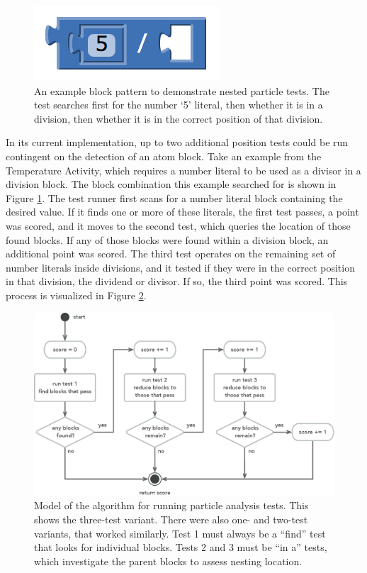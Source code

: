 \begin{figure}
  \centering
      \includegraphics{images/ch4-particle-example-5div}
  \caption[Example blocks to demonstrate nested particle tests]{An example block pattern to demonstrate nested particle tests. The test searches first for the number `5' literal, then whether it is in a division, then whether it is in the correct position of that division.}
  \label{fig:particle-example-5div}
\end{figure}
In its current implementation, up to two additional position tests could be run contingent on the detection of an atom block. Take an example from the Temperature Activity, which requires a number literal to be used as a divisor in a division block. The block combination this example searched for is shown in Figure \ref{fig:particle-example-5div}. The test runner first scans for a number literal block containing the desired value. If it finds one or more of these literals, the first test passes, a point was scored, and it moves to the second test, which queries the location of those found blocks. If any of those blocks were found within a division block, an additional point was scored. The third test operates on the remaining set of number literals inside divisions, and it tested if they were in the correct position in that division, the dividend or divisor. If so, the third point was scored. This process is visualized in Figure \ref{fig:particle-run3}.

\begin{figure}
  \centering
      \includegraphics[width=\textwidth]{diagrams/particle-run3}
  \caption[Particle analysis test running algorithm]{Model of the algorithm for running particle analysis tests. This shows the three-test variant. There were also one- and two-test variants, that worked similarly. Test 1 must always be a ``find'' test that looks for individual blocks. Tests 2 and 3 must be ``in a'' tests, which investigate the parent blocks to assess nesting location. 
  }
  \label{fig:particle-run3}
\end{figure}

